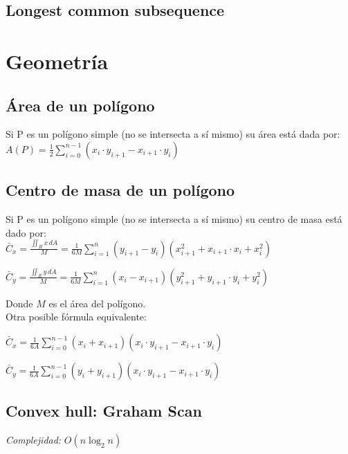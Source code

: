 \documentclass[10pt,letterpaper]{article}
\begin{document}
\subsection{Longest common subsequence}

\section{Geometría}
\subsection{Área de un polígono}
Si P es un polígono simple (no se intersecta a sí mismo) su área está dada por: \\

$ A(P) = \frac{1}{2} \displaystyle\sum_{i=0}^{n-1} (x_{i} \cdot y_{i+1} - x_{i+1} \cdot y_{i}) $ \\

\subsection{Centro de masa de un polígono}
Si P es un polígono simple (no se intersecta a sí mismo) su centro de masa está dado por: \\

$ \displaystyle\bar{C}_{x} = \frac{ \displaystyle\iint_{R} x \, dA }{M} = \frac{1}{6M}\sum_{i=1}^{n} (y_{i+1} - y_{i}) (x_{i+1}^2 + x_{i+1} \cdot x_{i} + x_{i}^2) $

\medskip

$\displaystyle\bar{C}_{y} = \frac{ \displaystyle\iint_{R} y \, dA }{M} = \frac{1}{6M} \sum_{i=1}^{n} (x_{i} - x_{i+1}) (y_{i+1}^2 + y_{i+1} \cdot y_{i} + y_{i}^2)$

\medskip

Donde $ M $ es el área del polígono. \\

Otra posible fórmula equivalente:

$ \displaystyle\bar{C}_{x} = \frac{1}{6A} \sum_{i=0}^{n-1} (x_{i} + x_{i+1}) (x_{i} \cdot y_{i+1} - x_{i+1} \cdot y_{i}) $

\medskip

$ \displaystyle\bar{C}_{y} = \frac{1}{6A} \sum_{i=0}^{n-1} (y_{i} + y_{i+1}) (x_{i} \cdot y_{i+1} - x_{i+1} \cdot y_{i}) $


\subsection{Convex hull: Graham Scan}
\emph{Complejidad:} $ O(n \log_{2}{n}) $
\end{document}
